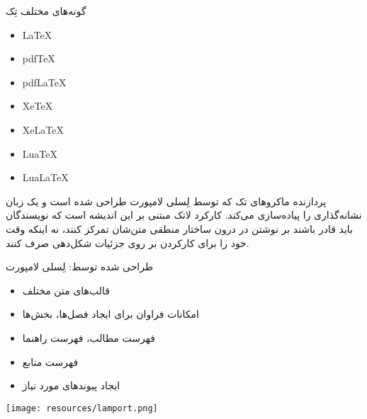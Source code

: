 \begin{plainslide}
\begin{block}{گونه‌های مختلف تِک}
\begin{latin}
\begin{itemize}
\item \LaTeX
\item pdf\TeX
\item pdf\LaTeX
\item Xe\TeX
\item Xe\LaTeX
\item Lua\TeX
\item Lua\LaTeX
\end{itemize}
\end{latin}
\end{block}
\end{plainslide}


\begin{plainslide}
پردازنده ماکروهای تک که توسط لِسلی لامپورت طراحی شده است و یک زبان نشانه‌گذاری را پیاده‌سازی می‌کند.  کارکرد لاتک مبتنی بر این اندیشه است که نویسندگان باید قادر باشند بر نوشتن در درون ساختار منطقی متن‌شان تمرکز کنند، نه اینکه وقت خود را برای کارکردن بر روی جزئیات شکل‌دهی صرف کنند.
\begin{block}{\lr{\LaTeX} طراحی شده توسط: لِسلی لامپورت}
\begin{minipage}[t]{.6\textwidth}{%
{\small
\vspace{-2cm}
\begin{itemize}
\item قالب‌های متن مختلف 
\item  امكانات فراوان برای ایجاد فصل‌ها، بخش‌ها
\item  فهرست مطالب، فهرست راهنما 
\item فهرست منابع
\item ایجاد پیوندهای مورد نیاز 
\end{itemize}}}\end{minipage}%
\begin{minipage}{.3\textwidth}{%
\begin{center}
\vspace{-.4cm}\hspace{6cm}
\texttt{[image: resources/lamport.png]}
\end{center}}\end{minipage}%
\end{block}
\end{plainslide}

